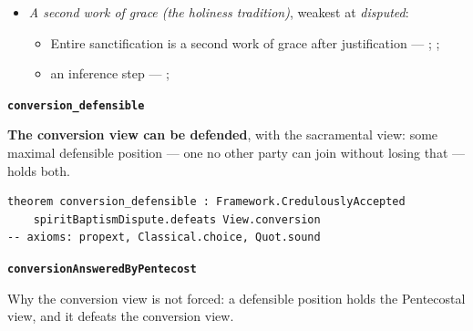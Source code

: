 \documentclass[11pt]{article}
\begin{document}
\begin{itemize}
\begin{itemize}
\item Luke’s narratives of receiving the Spirit are a pattern for believers today --- \cite{stronstad-charismatic-theology-1984}; \cite{assemblies-of-god-baptism-holy-spirit-2010}
\item an inference step --- \cite{assemblies-of-god-baptism-holy-spirit-2010}; \cite{dunn-baptism-holy-spirit-1970}; \cite{stott-baptism-fullness-1975}
\end{itemize}
\item \emph{A second work of grace (the holiness tradition)}, weakest at \emph{disputed}:
\begin{itemize}
\item Entire sanctification is a second work of grace after justification --- \cite[Articles of Faith, X, ¶10]{church-of-the-nazarene-manual-2023}; \cite[to Joseph Benson, 28 December 1770]{wesley-letters-1931}; \cite{bassett-white-paper-article-x-2010}
\item an inference step --- \cite[to Joseph Benson, 28 December 1770]{wesley-letters-1931}; \cite{bassett-white-paper-article-x-2010}
\end{itemize}
\end{itemize}
\par\medskip\noindent\textbf{\texttt{conversion\_\allowbreak{}defensible}}\par\nobreak\noindent
\textbf{The conversion view can be defended}, with the sacramental view: some maximal defensible position — one no other party can join without losing that — holds both.

{\small\begin{verbatim}
theorem conversion_defensible : Framework.CredulouslyAccepted
    spiritBaptismDispute.defeats View.conversion
-- axioms: propext, Classical.choice, Quot.sound
\end{verbatim}}
\par\medskip\noindent\textbf{\texttt{conversion\allowbreak{}Answered\allowbreak{}By\allowbreak{}Pentecost}}\par\nobreak\noindent
Why the conversion view is not forced: a defensible position holds the Pentecostal view, and it defeats the conversion view.
\end{document}
